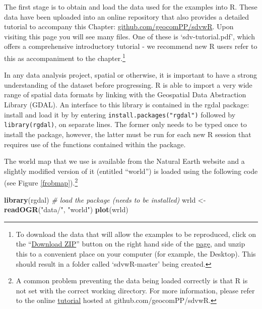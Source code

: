 \documentclass[]{article}
\newenvironment{Shaded}{}{}
\newcommand{\KeywordTok}[1]{\textcolor[rgb]{0.00,0.44,0.13}{\textbf{{#1}}}}
\newcommand{\StringTok}[1]{\textcolor[rgb]{0.25,0.44,0.63}{{#1}}}
\newcommand{\CommentTok}[1]{\textcolor[rgb]{0.38,0.63,0.69}{\textit{{#1}}}}
\newcommand{\NormalTok}[1]{{#1}}
\let\Oldincludegraphics\includegraphics
\renewcommand{\includegraphics}[1]{\Oldincludegraphics[width=10cm]{#1}}
\begin{document}
The first stage is to obtain and load the data used for the examples into R. These data have been uploaded into an online repository that also provides a detailed tutorial to accompany this Chapter:
\href{https://github.com/geocomPP/sdvwR/blob/master/sdv-tutorial.pdf?raw=true}{github.com/geocomPP/sdvwR}.
Upon visiting this page you will see many files. One of these is
`sdv-tutorial.pdf', which offers a comprehensive introductory tutorial -
we recommend new R users refer to this as accompaniment to the
chapter.\footnote{To
download the data that will allow the examples to be reproduced, click
on the ``\href{https://github.com/geocomPP/sdvwR/archive/master.zip}{Download ZIP}''
button on the right hand side of the 
\href{https://github.com/geocomPP/sdvwR/}{page}, 
and unzip this to a
convenient place on your computer (for example, the Desktop). This should
result in a folder called `sdvwR-master' being created.}

In any data analysis project, spatial or otherwise, it is important to
have a strong understanding of the dataset before progressing. R is able to import a very wide range of spatial data formats by linking with the Geospatial Data Abstraction Library (GDAL). An interface to this library
is contained in the rgdal package: install and load it by by
entering \texttt{install.packages("rgdal")} followed by
\texttt{library(rgdal)}, on separate lines. The former only needs to be
typed once to install the package, however, the latter must be
run for each new R session that requires use of the functions contained within the package.

The world map that we use is available from the Natural Earth website and a
slightly modified version of it (entitled ``world'') is loaded using the
following code (see Figure \ref{frobmap}).\footnote{A
common problem preventing the data being loaded
correctly is that R is not set with the correct working directory.
For more information, please refer to the online
\href{https://github.com/geocomPP/sdvwR/blob/master/sdv-tutorial.pdf?raw=true}{tutorial}
hosted at github.com/geocomPP/sdvwR.}

\begin{Shaded}
\begin{Highlighting}[]
\KeywordTok{library}\NormalTok{(rgdal)  }\CommentTok{# load the package (needs to be installed)}
\NormalTok{wrld <- }\KeywordTok{readOGR}\NormalTok{(}\StringTok{"data/"}\NormalTok{, }\StringTok{"world"}\NormalTok{)}
\KeywordTok{plot}\NormalTok{(wrld)}
\end{Highlighting}
\end{Shaded}
\end{document}
